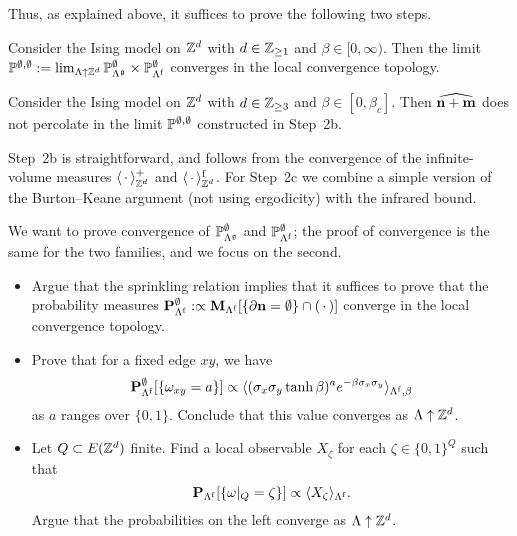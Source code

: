 Thus, as explained above, it suffices to prove the following two steps.

\begin{lemma}\label{lemma:continuity_step2b}
    Consider the Ising model on $\Z^d$ with $d\in\Z_{\geq 1}$
    and $\beta\in[0,\infty)$.
    Then the limit $\P^{\emptyset,\emptyset}:=
        \lim_{\Lambda\uparrow\Z^d}
        \P_{\Lambda^\frakg}^\emptyset\times\P_{\Lambda^\f}^\emptyset
        $ converges in the local convergence topology.
\end{lemma}

\begin{lemma}\label{lemma:continuity_step2c}
    Consider the Ising model on $\Z^d$ with $d\in\Z_{\geq 3}$
    and $\beta\in[0,\beta_c]$.
    Then $\widehat{\n+\m}$ does not percolate in the limit $\P^{\emptyset,\emptyset}$ constructed
    in Step~2b.
\end{lemma}

Step~2b is straightforward, and follows
from the convergence of the infinite-volume measures $\langle\blank\rangle^+_{\Z^d}$
and $\langle\blank\rangle^\f_{\Z^d}$.
For Step~2c we combine a simple version of the Burton--Keane argument
(not using ergodicity)
with the infrared bound.

\begin{exercise}
    We want to prove convergence
    of $\P_{\Lambda^\frakg}^\emptyset$ and $\P_{\Lambda^\f}^\emptyset$;
    the proof of convergence is the same for the two families,
    and we focus on the second.
    \begin{itemize}
        \item Argue that the sprinkling relation implies that it suffices to prove that the probability measures
        $\bfP_{\Lambda^\f}^\emptyset:\propto\bfM_{\Lambda^\f}[\{\partial\n=\emptyset\}\cap(\blank)]$
        converge in the local convergence topology.
        \item Prove that for a fixed edge $xy$,
        we have 
        \[
            \bfP_{\Lambda^\f}^\emptyset[\{\omega_{xy}=a\}]\propto 
            \langle
            (\sigma_x\sigma_y\tanh\beta)^a e^{-\beta\sigma_x\sigma_y}
            \rangle_{\Lambda^\f,\beta}
        \]
        as $a$ ranges over $\{0,1\}$.
        Conclude that this value converges as $\Lambda\uparrow\Z^d$.
        \item Let $Q\subset E(\Z^d)$ finite.
        Find a local observable $X_\zeta$ for each $\zeta\in\{0,1\}^Q$ such that
        \[
            \bfP_{\Lambda^\f}[\{\omega|_Q=\zeta\}]\propto \langle X_\zeta\rangle_{\Lambda^\f}.
        \]
        Argue that the probabilities on the left converge as $\Lambda\uparrow\Z^d$.
    \end{itemize}
\end{exercise}


